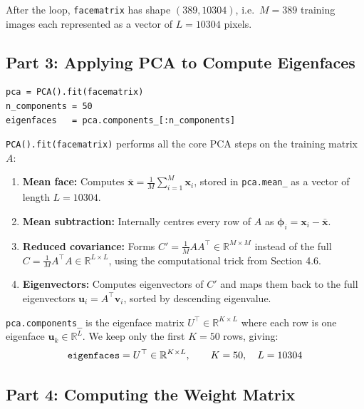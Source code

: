 \documentclass[12pt,a4paper]{article}
\begin{document}
After the loop, \texttt{facematrix} has shape $(389, 10304)$, i.e.\
$M = 389$ training images each represented as a vector of $L = 10304$ pixels.


\subsection{Part 3: Applying PCA to Compute Eigenfaces}

\begin{lstlisting}
pca = PCA().fit(facematrix)
n_components = 50
eigenfaces   = pca.components_[:n_components]
\end{lstlisting}

\texttt{PCA().fit(facematrix)} performs all the core PCA steps on the training
matrix $A$:

\begin{enumerate}
    \item \textbf{Mean face:} Computes $\bar{\mathbf{x}} = \frac{1}{M}\sum_{i=1}^{M}\mathbf{x}_i$,
          stored in \texttt{pca.mean\_} as a vector of length $L = 10304$.
    \item \textbf{Mean subtraction:} Internally centres every row of $A$
          as $\boldsymbol{\phi}_i = \mathbf{x}_i - \bar{\mathbf{x}}$.
    \item \textbf{Reduced covariance:} Forms $C' = \frac{1}{M}AA^\top \in \mathbb{R}^{M \times M}$
          instead of the full $C = \frac{1}{M}A^\top A \in \mathbb{R}^{L \times L}$,
          using the computational trick from Section 4.6.
    \item \textbf{Eigenvectors:} Computes eigenvectors of $C'$ and maps them
          back to the full eigenvectors $\mathbf{u}_i = A^\top\mathbf{v}_i$,
          sorted by descending eigenvalue.
\end{enumerate}

\texttt{pca.components\_} is the eigenface matrix $U^\top \in \mathbb{R}^{K \times L}$
where each row is one eigenface $\mathbf{u}_k \in \mathbb{R}^L$. We keep
only the first $K = 50$ rows, giving:
\[
\text{\texttt{eigenfaces}} = U^\top \in \mathbb{R}^{K \times L},
\qquad K = 50,\quad L = 10304
\]

\subsection{Part 4: Computing the Weight Matrix}
\end{document}
